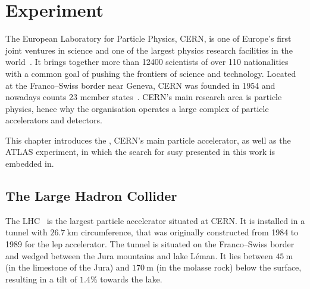 
\chapter{Experiment} 

\graphicspath{{chapter-experiment/Figs/Vector/}{chapter-experiment/Figs/}}



The European Laboratory for Particle Physics, CERN,  is one of Europe's first joint ventures in science and one of the largest physics research facilities in the world~\cite{CERN:2723123}. It brings together more than \num[group-separator={,}]{12400} scientists of over 110 nationalities~\cite{CERN:2723123} with a common goal of pushing the frontiers of science and technology.
Located at the Franco--Swiss border near Geneva, CERN was founded in 1954 and nowadays counts 23 member states~\cite{CERN:2723123}. CERN's main research area is particle physics, hence why the organisation operates a large complex of particle accelerators and detectors.

This chapter introduces the , CERN's main particle accelerator, as well as the ATLAS experiment, in which the search for \gls{susy} presented in this work is embedded in.

\section{The Large Hadron Collider}\label{sec:lhc}

The LHC~\cite{Bruning:782076} is the largest particle accelerator situated at CERN.
It is installed in a tunnel with $\SI{26.7}{\km}$ circumference, that was originally constructed from 1984 to 1989 for the \gls{lep} accelerator.
The tunnel is situated on the Franco--Swiss border and wedged between the Jura mountains and lake Léman. It lies between $\SI{45}{\meter}$ (in the limestone of the Jura) and $\SI{170}{\meter}$ (in the molasse rock) below the surface, resulting in a tilt of $1.4\%$ towards the lake.

